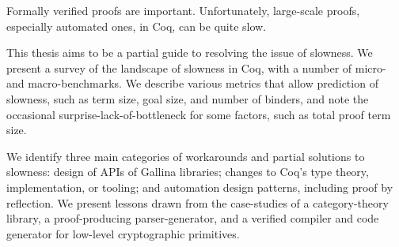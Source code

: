 %
%
%
%
%
Formally verified proofs are important.
Unfortunately, large-scale proofs, especially automated ones, in Coq, can be quite slow.

This thesis aims to be a partial guide to resolving the issue of slowness.
We present a survey of the landscape of slowness in Coq, with a number of micro- and macro-benchmarks.
We describe various metrics that allow prediction of slowness, such as term size, goal size, and number of binders, and note the occasional surprise-lack-of-bottleneck for some factors, such as total proof term size.

We identify three main categories of workarounds and partial solutions to slowness: design of APIs of Gallina libraries; changes to Coq's type theory, implementation, or tooling; and automation design patterns, including proof by reflection.
We present lessons drawn from the case-studies of a category-theory library, a proof-producing parser-generator, and a verified compiler and code generator for low-level cryptographic primitives.

